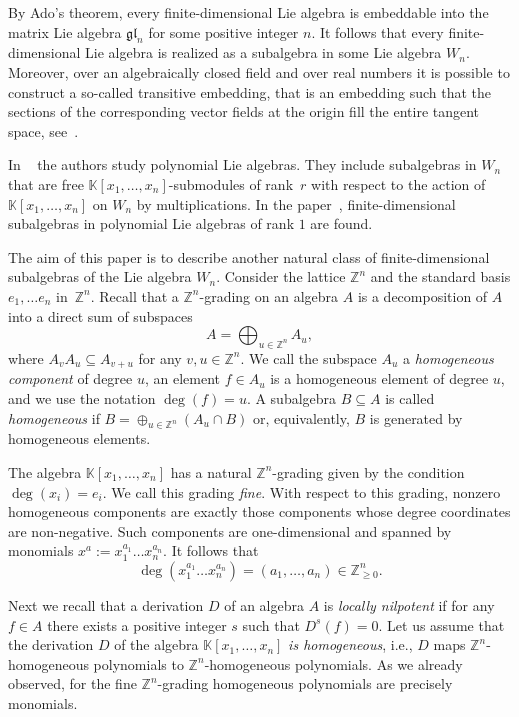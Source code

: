 \documentclass[a4paper, 12pt,oneside,reqno]{amsart}
\numberwithin{equation}{section}
\theoremstyle{definition}
\begin{document}
By Ado's theorem, every finite-dimensional Lie algebra is embeddable into the matrix Lie algebra $\mathfrak{gl}_n$ for some positive integer $n$. It follows that every finite-dimensional Lie algebra is realized as a subalgebra in some Lie algebra $W_n$. Moreover, over an algebraically closed field and over real numbers it is possible to construct a so-called transitive embedding, that is an embedding such that the sections of the corresponding vector fields at the origin fill the entire tangent space, see~\cite{Go,Dr,Gr}.

In ~\cite{BL} the authors study polynomial Lie algebras. They include subalgebras in $W_n$ that are free $\mathbb{K}[x_1,\ldots,x_n]$-submodules of rank~$r$ with respect to the action of $ \mathbb{K}[x_1,\ldots,x_n]$ on $W_n$ by multiplications. In the paper~\cite{AMP}, finite-dimensional subalgebras in polynomial Lie algebras of rank $1$ are found.

The aim of this paper is to describe another natural class of finite-dimensional subalgebras of the Lie algebra $W_n$. Consider the lattice $\mathbb{Z}^n$ and the standard basis $e_1,\ldots e_n$ in~$\mathbb{Z}^n$. Recall that a $\mathbb{Z}^n$-grading on an algebra $A$ is a decomposition of $A$ into a direct sum of subspaces
\[
A=\bigoplus_{u\in\mathbb{Z}^n} A_u,
\]
where $A_vA_u\subseteq A_{v+u}$ for any $v,u\in\mathbb{Z}^n$. We call the subspace $A_u$ a \emph{homogeneous component} of degree $u$, an element $f\in A_u$ is a homogeneous element of degree $u$, and we use the notation $\deg(f)=u$. A subalgebra $B\subseteq A$ is called \emph{homogeneous} if $B=\oplus_{u\in\mathbb{Z}^n} (A_u\cap B)$ or, equivalently, $B$ is generated by homogeneous elements.

The algebra $\mathbb{K}[x_1,\ldots,x_n]$ has a natural $\mathbb{Z}^n$-grading given by the condition $\deg(x_i)=e_i$. We call this grading \emph{fine}. With respect to this grading, 
nonzero homogeneous components are exactly those components whose degree coordinates are non-negative. Such components are one-dimensional and spanned by monomials $x^a:=x_1^{a_1}\ldots x_n^{a_n}$. It follows that
\[
\deg(x_1^{a_1}\ldots x_n^{a_n})=(a_1,\ldots,a_n)\in\mathbb{Z}^n_{\ge 0}.
\]

Next we recall that a derivation $D$ of an algebra $A$ is {\it locally nilpotent} if for any $f\in A$ there exists a positive integer $s$ such that ${D^s(f)=0}$.
Let us assume that the derivation $D$ of the algebra $\mathbb{K}[x_1,\ldots,x_n]$ {\it is homogeneous}, i.e., $D$ maps $\mathbb{Z}^n$-homogeneous polynomials to $\mathbb{Z }^n$-homogeneous polynomials. As we already observed, for the fine $\mathbb{Z}^n$-grading homogeneous polynomials are precisely monomials.
\end{document}
